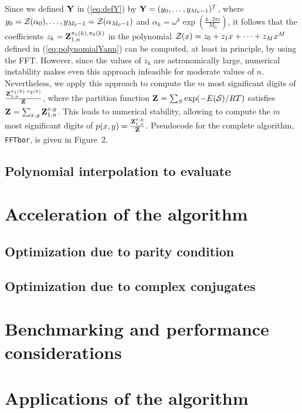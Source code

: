 Since we defined $\bf Y$ in (\ref{eq:defY}) by ${\bf Y} =
(y_0,\dots,y_{M_0-1})^T$, where
$y_0={\mathcal Z}_{}(\alpha_0),\dots, y_{M_0-1}={\mathcal Z}_{}(\alpha_{M_0-1})$ and $\alpha_k = \omega^k
\exp(\frac{k \cdot 2\pi i}{M_0})$,
it follows that the coefficients
$z_k={\bf Z}^{\pi_1(k),\pi_2(k)}_{1,n}$ in the polynomial
${\mathcal Z}_{}(x) = z_0 + z_1 x + \dots + z_{M} x^{M}$ defined in
(\ref{eq:polynomialYann}) can be computed, at least in principle,
by using the FFT. However, since the values of
$z_{k}$ are astronomically large, numerical
instability makes even this approach infeasible for moderate values of $n$.
Nevertheless, we apply this approach to compute the $m$ most significant
digits of $\frac{{\bf Z}^{\pi_1(k),\pi_2(k)}_{1,n}}{{\bf Z}^{}_{}}$,
where the partition function ${\bf Z}^{}_{} = \sum_{S} \exp(-E(\mathcal S)/RT)$ satisfies
${{\bf Z}^{}_{}} = \sum_{x,y} {\bf Z}^{x,y}_{1,n}$. This leads to numerical stability,
allowing \ffttwo to compute the
$m$ most significant digits of $p(x,y) = \frac{{\bf Z}^{x,y}_{1,n}}{{\bf Z}^{}_{}}$.
Pseudocode for the complete algorithm, {\tt FFTbor}, is given in
Figure~2.

\subsection{Polynomial interpolation to evaluate
\texorpdfstring{}{}}
\label{subsec:ffttwo:fft}

\section{Acceleration of the \ffttwo algorithm}
\label{sec:ffttwo:perf}

\subsection{Optimization due to parity condition}
\label{subsec:ffttwo:parity}

\subsection{Optimization due to complex conjugates}
\label{subsec:ffttwo:compconj}

\section{Benchmarking and performance considerations}
\label{sec:ffttwo:benchmarking}

\section{Applications of the \ffttwo algorithm}
\label{sec:ffttwo:applications}
